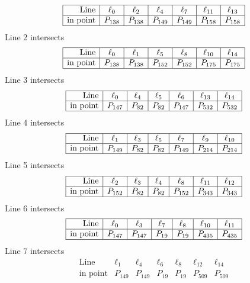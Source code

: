 \documentclass{article}
\begin{document}
{$$\begin{array}{|r*{6}{|c}|}
\hline
\mbox{Line}  & \ell_{0} & \ell_{2} & \ell_{4} & \ell_{7} & \ell_{11} & \ell_{13}\\
\hline
\mbox{in point}  & P_{138} & P_{138} & P_{149} & P_{149} & P_{158} & P_{158}\\
\hline
\end{array}
$$
Line 2 intersects 
$$
\begin{array}{|r*{6}{|c}|}
\hline
\mbox{Line}  & \ell_{0} & \ell_{1} & \ell_{5} & \ell_{8} & \ell_{10} & \ell_{14}\\
\hline
\mbox{in point}  & P_{138} & P_{138} & P_{152} & P_{152} & P_{175} & P_{175}\\
\hline
\end{array}
$$
Line 3 intersects 
$$
\begin{array}{|r*{6}{|c}|}
\hline
\mbox{Line}  & \ell_{0} & \ell_{4} & \ell_{5} & \ell_{6} & \ell_{13} & \ell_{14}\\
\hline
\mbox{in point}  & P_{147} & P_{82} & P_{82} & P_{147} & P_{532} & P_{532}\\
\hline
\end{array}
$$
Line 4 intersects 
$$
\begin{array}{|r*{6}{|c}|}
\hline
\mbox{Line}  & \ell_{1} & \ell_{3} & \ell_{5} & \ell_{7} & \ell_{9} & \ell_{10}\\
\hline
\mbox{in point}  & P_{149} & P_{82} & P_{82} & P_{149} & P_{214} & P_{214}\\
\hline
\end{array}
$$
Line 5 intersects 
$$
\begin{array}{|r*{6}{|c}|}
\hline
\mbox{Line}  & \ell_{2} & \ell_{3} & \ell_{4} & \ell_{8} & \ell_{11} & \ell_{12}\\
\hline
\mbox{in point}  & P_{152} & P_{82} & P_{82} & P_{152} & P_{343} & P_{343}\\
\hline
\end{array}
$$
Line 6 intersects 
$$
\begin{array}{|r*{6}{|c}|}
\hline
\mbox{Line}  & \ell_{0} & \ell_{3} & \ell_{7} & \ell_{8} & \ell_{10} & \ell_{11}\\
\hline
\mbox{in point}  & P_{147} & P_{147} & P_{19} & P_{19} & P_{435} & P_{435}\\
\hline
\end{array}
$$
Line 7 intersects 
$$
\begin{array}{|r*{6}{|c}|}
\hline
\mbox{Line}  & \ell_{1} & \ell_{4} & \ell_{6} & \ell_{8} & \ell_{12} & \ell_{14}\\
\hline
\mbox{in point}  & P_{149} & P_{149} & P_{19} & P_{19} & P_{509} & P_{509}\\

\end{array}$$}
\end{document}
